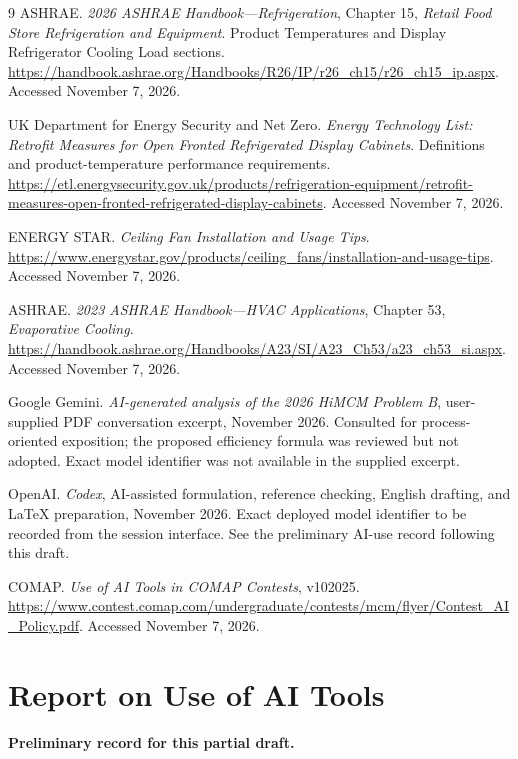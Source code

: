 \documentclass[12pt]{article}
\begin{document}
\clearpage
{}
{}
\begin{thebibliography}{9}
ASHRAE. \emph{2026 ASHRAE Handbook---Refrigeration},
Chapter 15, \emph{Retail Food Store Refrigeration and Equipment}.
Product Temperatures and Display Refrigerator Cooling Load sections.
\url{https://handbook.ashrae.org/Handbooks/R26/IP/r26_ch15/r26_ch15_ip.aspx}.
Accessed November 7, 2026.

UK Department for Energy Security and Net Zero.
\emph{Energy Technology List: Retrofit Measures for Open Fronted Refrigerated Display Cabinets}.
Definitions and product-temperature performance requirements.
\url{https://etl.energysecurity.gov.uk/products/refrigeration-equipment/retrofit-measures-open-fronted-refrigerated-display-cabinets}.
Accessed November 7, 2026.

ENERGY STAR. \emph{Ceiling Fan Installation and Usage Tips}.
\url{https://www.energystar.gov/products/ceiling_fans/installation-and-usage-tips}.
Accessed November 7, 2026.

ASHRAE. \emph{2023 ASHRAE Handbook---HVAC Applications},
Chapter 53, \emph{Evaporative Cooling}.
\url{https://handbook.ashrae.org/Handbooks/A23/SI/A23_Ch53/a23_ch53_si.aspx}.
Accessed November 7, 2026.

Google Gemini. \emph{AI-generated analysis of the 2026 HiMCM Problem B},
user-supplied PDF conversation excerpt, November 2026.
Consulted for process-oriented exposition; the proposed efficiency formula was
reviewed but not adopted. Exact model identifier was not available in the supplied excerpt.

OpenAI. \emph{Codex}, AI-assisted formulation, reference checking,
English drafting, and LaTeX preparation, November 2026.
Exact deployed model identifier to be recorded from the session interface.
See the preliminary AI-use record following this draft.

COMAP. \emph{Use of AI Tools in COMAP Contests}, v102025.
\url{https://www.contest.comap.com/undergraduate/contests/mcm/flyer/Contest_AI_Policy.pdf}.
Accessed November 7, 2026.
\end{thebibliography}

\clearpage
{}
{}
\section*{Report on Use of AI Tools}
\noindent\textbf{Preliminary record for this partial draft.}
\end{document}
